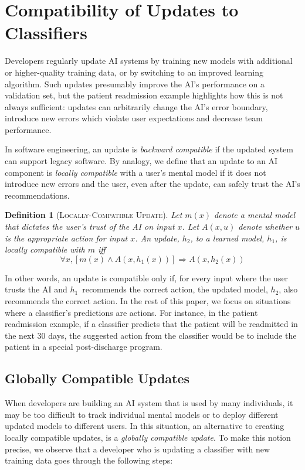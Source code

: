 \documentclass[letterpaper]{article}
\newtheorem*{definition}{Definition}
\newcommand{\hone}{\mbox{$h_1$}}
\newcommand{\htwo}{\mbox{$h_2$}}
\begin{document}
\section{Compatibility of Updates to Classifiers}

Developers regularly update AI systems by training new models with additional or higher-quality training data, or by switching to an improved learning algorithm. 
Such updates presumably improve the AI's performance on a validation set, but the patient readmission example highlights how this is not always sufficient: updates can arbitrarily change the AI's error boundary, introduce new errors which violate user expectations and decrease team performance.

In software engineering, an update is \emph{backward compatible} if the updated system can support legacy software.
By analogy, we define that an update to an AI component is {\em locally compatible} with a user's mental model if it does not introduce new errors and the user, even after the update, can safely trust the AI's recommendations. 


\begin{definition}[\textsc{Locally-Compatible Update}]
Let $m(x)$ denote a mental model that dictates the user's trust of the AI on input $x$.  Let $A(x,u)$ denote whether $u$ is the appropriate action for input $x$. 
An update, \htwo, to a learned model, \hone, is locally compatible with $m$ iff 
\[\forall x, [m(x) \wedge A(x, \hone(x))] \Rightarrow A(x, \htwo(x)) \]
\end{definition}

In other words, an update is compatible only if, for every input where the user trusts the AI and \hone\ recommends the correct action, the updated model, \htwo, also recommends the correct action. In the rest of this paper, we focus on situations where a classifier's predictions are actions. For instance, in the patient readmission example, if a classifier predicts that the patient will be readmitted in the next 30 days, the suggested action from the classifier would be to include the patient in a special post-discharge program.

\subsection{Globally Compatible Updates}

When developers are building an AI system that is used by many individuals, it may be too difficult to track individual mental models or to deploy different updated models to different users. In this situation, an alternative to creating locally compatible updates, is a {\em globally compatible update}. To make this notion precise, we observe that a developer who is updating a classifier with new training data goes through the following steps: 
\end{document}
